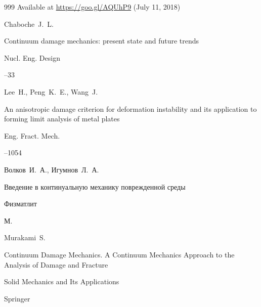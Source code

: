 \begin{thebibliography}{999}
\elink Available at \url{https://goo.gl/AQUhP9} (July 11, 2018)








\by Chaboche~J.~L. 

\paper Continuum damage mechanics: present state and future trends

\jour Nucl. Eng. Design




--33





\by Lee~H., Peng~K.~E., Wang~J.

\paper An anisotropic damage criterion for deformation instability and its application to forming limit analysis of metal plates

\jour Eng. Fract. Mech.




--1054





\by Волков~И.~А., Игумнов~Л.~А. 

\book Введение в континуальную механику поврежденной среды


\publ Физматлит

\publaddr М.







\by Murakami~S. 

\book Continuum Damage Mechanics. A Continuum Mechanics Approach to the Analysis of Damage and Fracture

\serial Solid Mechanics and Its Applications



\publ Springer


\end{thebibliography}

